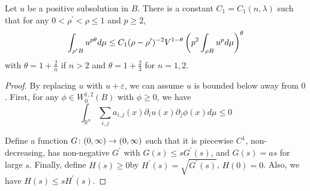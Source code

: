 \begin{enumerate}[label=\Roman*.]
	\begin{lem}
		Let $u$ be a positive subsolution in $B$. There is a constant $C_1 = C_1(n,\lambda)$ such that for any $0<\rho^{\prime}<\rho \leq 1$ and $p \geq 2$,
		\begin{equation*}
			\int_{\rho^\prime B} u^{p\theta} d\mu \leq C_1(\rho - \rho^\prime)^{-2}V^{1-\theta}\left(p^2 \int_{\rho B}u^pd\mu\right)^\theta
		\end{equation*}
		with $\theta = 1+\frac{2}{n}$ if $n > 2$ and $\theta = 1 + \frac{2}{3}$ for $n = 1, 2$.
	\end{lem}
	\begin{proof}
		By replacing $u$ with $u+\varepsilon$, we can assume $u$ is bounded below away from $0$. First, for any $\phi \in W_0^{1,2}(B)$ with $\phi \geq 0$, we have
		\begin{equation*}
			\int_{\mathbb{R}^n} \sum_{i, j} a_{i, j}(x) \partial_i u(x) \partial_j \phi(x) d\mu \leq 0
		\end{equation*}

		\noindent Define a function $G \colon (0,\infty) \rightarrow (0,\infty)$ such that it is piecewise $C^1$, non-decreasing, has non-negative $G^\prime$ with $G(s) \leq sG^\prime(s)$, and $G(s) = as$ for large $s$. Finally, define $H(s) \geq 0$by $H^\prime(s) = \sqrt{G^\prime(s)}$, $H(0) = 0$. Also, we have $H(s) \leq sH^\prime(s)$.


\end{proof}
\end{enumerate}
